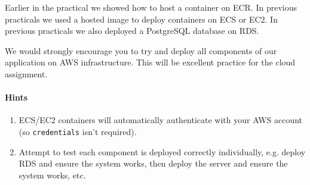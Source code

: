 \documentclass{csse4400}
\begin{document}
Earlier in the practical we showed how to host a container on ECR.
In previous practicals we used a hosted image to deploy containers on ECS or EC2.
In previous practicals we also deployed a PostgreSQL database on RDS.

We would strongly encourage you to try and deploy all components of our application on AWS infrastructure.
This will be excellent practice for the cloud assignment.

\paragraph{Hints}
\begin{enumerate}
    \item ECS/EC2 containers will automatically authenticate with your AWS account (so \texttt{credentials} isn't required).
    \item Attempt to test each component is deployed correctly individually, e.g. deploy RDS and ensure the system works, then deploy the server and ensure the system works, etc.
\end{enumerate}



\end{document}

